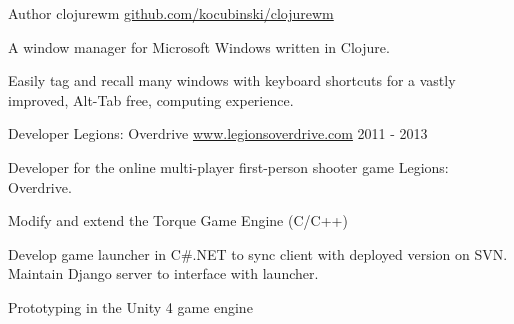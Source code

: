\documentclass[11pt, letterpaper]{awesome-cv}
\begin{document}
\begin{cventries}
  \cventry
    {Author}
    {clojurewm}
    {\href{https://github.com/kocubinski/clojurewm}{github.com/kocubinski/clojurewm}}
    {}
    {
      \begin{cvitems}
        \item {A window manager for Microsoft Windows written in Clojure.}
        \item {Easily tag and recall many windows with keyboard shortcuts for a vastly improved, Alt-Tab free, computing experience.}
      \end{cvitems}
    }
\end{cventries}

\begin{cventries}
  \cventry
    {Developer}
    {Legions: Overdrive}
    {\href{http://www.legionsoverdrive.com}{www.legionsoverdrive.com}}
    {2011 - 2013}
    {
      \begin{cvitems}
        \item {Developer for the online multi-player first-person shooter game Legions: Overdrive.}
        \item {Modify and extend the Torque Game Engine (C/C++)}
        \item {Develop game launcher in C\#.NET to sync client with deployed version on SVN.  Maintain Django server to interface with launcher.}
        \item {Prototyping in the Unity 4 game engine}
      \end{cvitems}
    }
\end{cventries}


\end{document}
